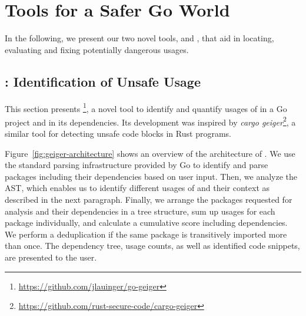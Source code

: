 
\section{Tools for a Safer Go World}
\label{sec:appr}

In the following, we present our two novel tools, \toolUsage{} and \toolSA{}, that aid in locating, evaluating and fixing potentially dangerous \unsafe{} usages.






\subsection{\toolUsage{}: Identification of Unsafe Usage}
\label{sec:appr:toolUsage}

This section presents \toolUsage{}\footnote{\url{https://github.com/jlauinger/go-geiger}}, a novel tool to identify and quantify usages of \unsafe{} in a Go project and in its dependencies. 
Its development was inspired by \textit{cargo geiger}\footnote{\url{https://github.com/rust-secure-code/cargo-geiger}}, a similar tool for detecting unsafe code blocks in Rust programs.


Figure~\ref{fig:geiger-architecture} shows an overview of the architecture of \toolUsage{}.
We use the standard parsing infrastructure provided by Go to identify and parse packages including their dependencies based on user input.
Then, we analyze the AST, %
which enables us to identify different usages of \unsafe{} and their context as described in the next paragraph.
Finally, we arrange the packages requested for analysis and their dependencies in a tree structure, sum up \unsafe{} usages for each package individually, and calculate a cumulative score including dependencies.
We perform a deduplication if the same package is transitively imported more than once.
The \unsafe{} dependency tree, usage counts, as well as identified code snippets, are presented to the user.

